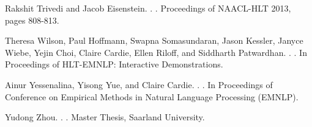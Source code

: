 \documentclass[11pt,letterpaper]{article}
\begin{document}
\begin{thebibliography}{}
Rakshit Trivedi and Jacob Eisenstein.
.
.
\newblock Proceedings of NAACL-HLT 2013, pages 808-813.

Theresa Wilson, Paul Hoffmann, Swapna Somasundaran, Jason Kessler, Janyce Wiebe, Yejin Choi, Claire Cardie, Ellen Riloff, and Siddharth Patwardhan. 
.
.
\newblock In Proceedings of HLT-EMNLP: Interactive Demonstrations.

Ainur Yessenalina, Yisong Yue, and Claire Cardie.
.
. 
\newblock In Proceedings of Conference on Empirical Methods in Natural Language Processing (EMNLP).

Yudong Zhou.
.
.
\newblock Master Thesis, Saarland University.

\end{thebibliography}
\newpage
\appendix
\end{document}
